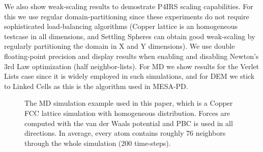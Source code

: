 \documentclass[preprint,12pt]{elsarticle}
\begin{document}
We also show weak-scaling results to demostrate P4IRS scaling capabilities.
For this we use regular domain-partitioning since these experiments do not require sophisticated load-balancing algorithms (Copper lattice is an homogeneous testcase in all dimensions, and Settling Spheres can obtain good weak-scaling by regularly partitioning the domain in X and Y dimensions).
We use double floating-point precision and display results when enabling and disabling Newton's 3rd Law optimization (half neighbor-lists).
For \ac{MD} we show results for the Verlet Lists case since it is widely employed in such simulations, and for \ac{DEM} we stick to Linked Cells as this is the algorithm used in MESA-PD.

\begin{figure}[tb]
    \centering
    \caption{The MD simulation example used in this paper, which is a Copper FCC lattice simulation with homogeneous distribution. Forces are computed with the van der Waals potential and PBC is used in all directions. In average, every atom contains roughly 76 neighbors through the whole simulation (200 time-steps).}
    \label{fig:copper_fcc_lattice}
\end{figure}
\end{document}
